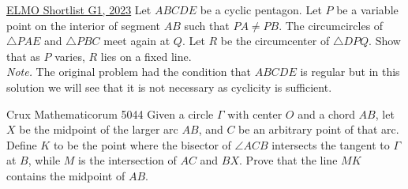 \begin{problem}{14}{\href{https://artofproblemsolving.com/community/c6h3100572p28033718}{ELMO Shortlist G1, 2023}} 
	Let $ABCDE$ be a cyclic pentagon. Let $P$ be a variable point on the interior of segment $AB$ such that $PA\ne PB$. The circumcircles of $\triangle PAE$ and $\triangle PBC$ meet again at $Q$. Let $R$ be the circumcenter of $\triangle DPQ$. Show that as $P$ varies, $R$ lies on a fixed line.\\
	\emph{Note.} The original problem had the condition that $ABCDE$ is regular but in this solution we will see that it is not necessary as cyclicity is sufficient.
\end{problem}

\begin{problem}{15}{Crux Mathematicorum 5044} 
	Given a circle $\Gamma$ with center $O$ and a chord $AB$, let $X$ be the midpoint of the larger arc $AB$, and $C$ be an arbitrary point of that arc. Define $K$ to be the point where the bisector of $\angle ACB$ intersects the tangent to $\Gamma$ at $B$, while $M$ is the intersection of $AC$ and $BX$. Prove that the line $MK$ contains the midpoint of $AB$.
\end{problem}


\newpage
